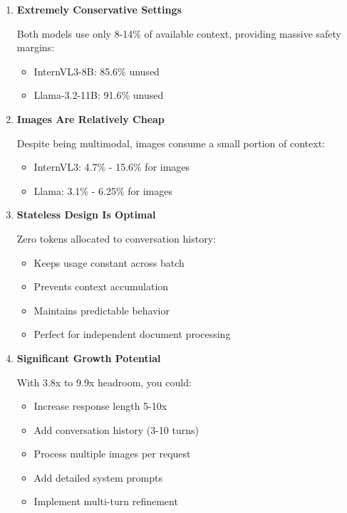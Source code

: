 \documentclass[11pt,a4paper]{article}
\begin{document}
\begin{enumerate}[leftmargin=*]
    \item \textbf{Extremely Conservative Settings}

    Both models use only 8-14\% of available context, providing massive safety margins:
    \begin{itemize}
        \item InternVL3-8B: 85.6\% unused
        \item Llama-3.2-11B: 91.6\% unused
    \end{itemize}

    \item \textbf{Images Are Relatively Cheap}

    Despite being multimodal, images consume a small portion of context:
    \begin{itemize}
        \item InternVL3: 4.7\% - 15.6\% for images
        \item Llama: 3.1\% - 6.25\% for images
    \end{itemize}

    \item \textbf{Stateless Design Is Optimal}

    Zero tokens allocated to conversation history:
    \begin{itemize}
        \item Keeps usage constant across batch
        \item Prevents context accumulation
        \item Maintains predictable behavior
        \item Perfect for independent document processing
    \end{itemize}

    \item \textbf{Significant Growth Potential}

    With 3.8x to 9.9x headroom, you could:
    \begin{itemize}
        \item Increase response length 5-10x
        \item Add conversation history (3-10 turns)
        \item Process multiple images per request
        \item Add detailed system prompts
        \item Implement multi-turn refinement
    \end{itemize}


\end{enumerate}
\end{document}
